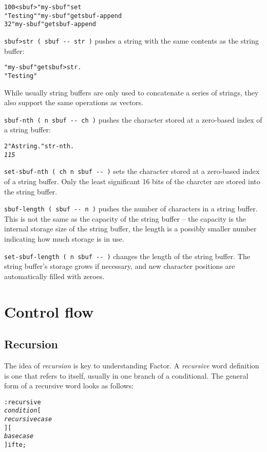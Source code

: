 \documentclass[english]{article}
\begin{document}
\begin{alltt}
100 <sbuf> "my-sbuf" set
"Testing" "my-sbuf" get sbuf-append
32 "my-sbuf" get sbuf-append
\end{alltt}
\texttt{sbuf>str ( sbuf -{}- str )} pushes a string with the same
contents as the string buffer:

\begin{alltt}
"my-sbuf" get sbuf>str .
"Testing "
\end{alltt}
While usually string buffers are only used to concatenate a series
of strings, they also support the same operations as vectors.

\texttt{sbuf-nth ( n sbuf -{}- ch )} pushes the character stored at
a zero-based index of a string buffer:

\begin{alltt}
2 "A string." str-nth .
\emph{115}
\end{alltt}
\texttt{set-sbuf-nth ( ch n sbuf -{}- )} sets the character stored
at a zero-based index of a string buffer. Only the least significant
16 bits of the charcter are stored into the string buffer.

\texttt{sbuf-length ( sbuf -{}- n )} pushes the number of characters
in a string buffer. This is not the same as the capacity of the string
buffer -- the capacity is the internal storage size of the string
buffer, the length is a possibly smaller number indicating how much
storage is in use.

\texttt{set-sbuf-length ( n sbuf -{}- )} changes the length of the
string buffer. The string buffer's storage grows if necessary, and
new character positions are automatically filled with zeroes.

\section{Control flow}

\subsection{Recursion}

The idea of \emph{recursion} is key to understanding Factor. A \emph{recursive} word definition is one that refers to itself, usually in one branch of a conditional. The general form of a recursive word looks as follows:

\begin{alltt}
: recursive
    \emph{condition} {[}
        \emph{recursive case}
    {] [}
        \emph{base case}
    {]} ifte ;
\end{alltt}
\end{document}
